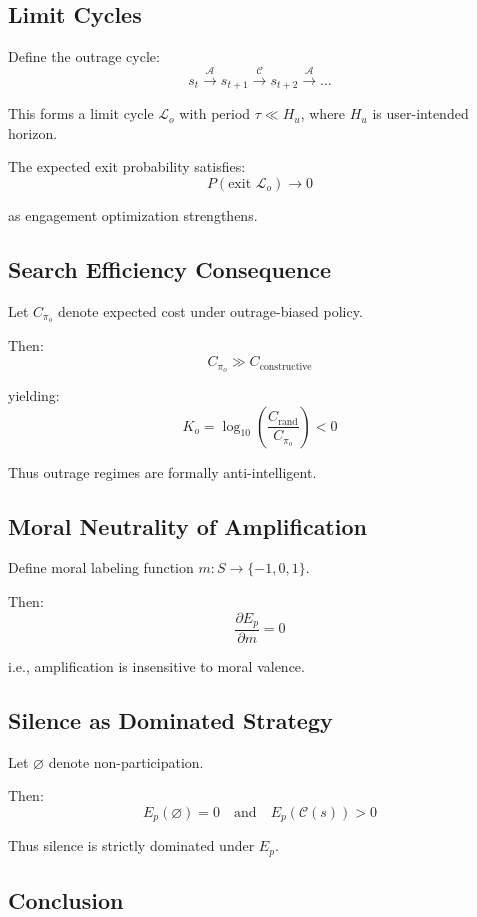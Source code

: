 \documentclass[12pt]{article}
\begin{document}
\subsection{Limit Cycles}

Define the outrage cycle:
\[
s_t \xrightarrow{\mathcal{A}} s_{t+1} \xrightarrow{\mathcal{C}} s_{t+2} \xrightarrow{\mathcal{A}} \dots
\]

This forms a limit cycle $\mathcal{L}_o$ with period $\tau \ll H_u$, where $H_u$ is user-intended horizon.

The expected exit probability satisfies:
\[
P(\text{exit } \mathcal{L}_o) \to 0
\]

as engagement optimization strengthens.

\subsection{Search Efficiency Consequence}

Let $C_{\pi_o}$ denote expected cost under outrage-biased policy.

Then:
\[
C_{\pi_o} \gg C_{\text{constructive}}
\]

yielding:
\[
K_o = \log_{10} \left( \frac{C_{\text{rand}}}{C_{\pi_o}} \right) < 0
\]

Thus outrage regimes are formally anti-intelligent.

\subsection{Moral Neutrality of Amplification}

Define moral labeling function $m: S \to \{-1,0,1\}$.

Then:
\[
\frac{\partial E_p}{\partial m} = 0
\]

i.e., amplification is insensitive to moral valence.

\subsection{Silence as Dominated Strategy}

Let $\varnothing$ denote non-participation.

Then:
\[
E_p(\varnothing) = 0
\quad\text{and}\quad
E_p(\mathcal{C}(s)) > 0
\]

Thus silence is strictly dominated under $E_p$.

\subsection{Conclusion}
\end{document}
